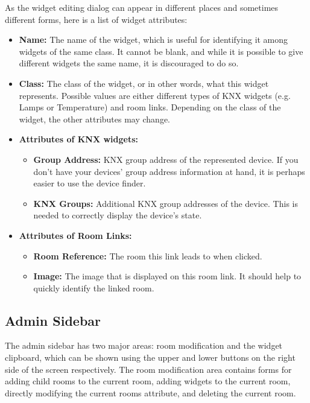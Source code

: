   As the widget editing dialog can appear in different places and sometimes different forms, here is a list of widget attributes:
  \begin{itemize}
    \item \textbf{Name:} The name of the widget, which is useful for identifying it among widgets of the same class. It cannot be blank, and while it is possible to give different widgets the same name, it is discouraged to do so.
    \item \textbf{Class:} The class of the widget, or in other words, what this widget represents. Possible values are either different types of KNX widgets (e.g. Lamps or Temperature) and room links. Depending on the class of the widget, the other attributes may change.
    \item \textbf{Attributes of KNX widgets:}
    \begin{itemize}
      \item \textbf{Group Address:} KNX group address of the represented device. If you don't have your devices' group address information at hand, it is perhaps easier to use the device finder.
      \item \textbf{KNX Groups:} Additional KNX group addresses of the device. This is needed to correctly display the device's state.
    \end{itemize}
    \item \textbf{Attributes of Room Links:}
    \begin{itemize}
      \item \textbf{Room Reference:} The room this link leads to when clicked.
      \item \textbf{Image:} The image that is displayed on this room link. It should help to quickly identify the linked room.
    \end{itemize}
  \end{itemize}

\subsection{Admin Sidebar}

  The admin sidebar has two major areas: room modification and the widget clipboard, which can be shown using the upper and lower buttons on the right side of the screen respectively. The room modification area contains forms for adding child rooms to the current room, adding widgets to the current room, directly modifying the current rooms attribute, and deleting the current room.

